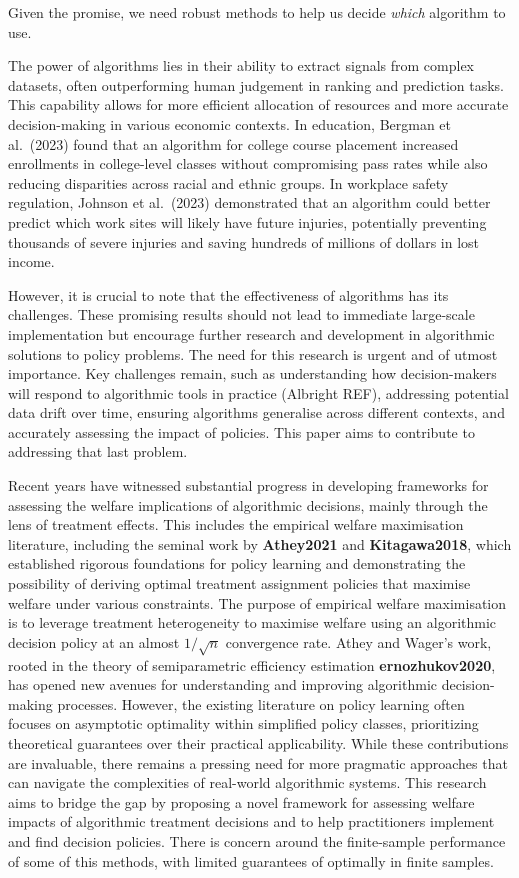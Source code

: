 \documentclass[
]{article}
\begin{document}
Given the promise, we need robust methods to help us decide \emph{which}
algorithm to use.

The power of algorithms lies in their ability to extract signals from
complex datasets, often outperforming human judgement in ranking and
prediction tasks. This capability allows for more efficient allocation
of resources and more accurate decision-making in various economic
contexts. In education, Bergman et al.~(2023) found that an algorithm
for college course placement increased enrollments in college-level
classes without compromising pass rates while also reducing disparities
across racial and ethnic groups. In workplace safety regulation, Johnson
et al.~(2023) demonstrated that an algorithm could better predict which
work sites will likely have future injuries, potentially preventing
thousands of severe injuries and saving hundreds of millions of dollars
in lost income.

However, it is crucial to note that the effectiveness of algorithms has
its challenges. These promising results should not lead to immediate
large-scale implementation but encourage further research and
development in algorithmic solutions to policy problems. The need for
this research is urgent and of utmost importance. Key challenges remain,
such as understanding how decision-makers will respond to algorithmic
tools in practice (Albright REF), addressing potential data drift over
time, ensuring algorithms generalise across different contexts, and
accurately assessing the impact of policies. This paper aims to
contribute to addressing that last problem.

Recent years have witnessed substantial progress in developing
frameworks for assessing the welfare implications of algorithmic
decisions, mainly through the lens of treatment effects. This includes
the empirical welfare maximisation literature, including the seminal
work by \textbf{Athey2021} and \textbf{Kitagawa2018}, which established
rigorous foundations for policy learning and demonstrating the
possibility of deriving optimal treatment assignment policies that
maximise welfare under various constraints. The purpose of empirical
welfare maximisation is to leverage treatment heterogeneity to maximise
welfare using an algorithmic decision policy at an almost \(1/\sqrt{n}\)
convergence rate. Athey and Wager's work, rooted in the theory of
semiparametric efficiency estimation \textbf{ernozhukov2020}, has opened
new avenues for understanding and improving algorithmic decision-making
processes. However, the existing literature on policy learning often
focuses on asymptotic optimality within simplified policy classes,
prioritizing theoretical guarantees over their practical applicability.
While these contributions are invaluable, there remains a pressing need
for more pragmatic approaches that can navigate the complexities of
real-world algorithmic systems. This research aims to bridge the gap by
proposing a novel framework for assessing welfare impacts of algorithmic
treatment decisions and to help practitioners implement and find
decision policies. There is concern around the finite-sample performance
of some of this methods, with limited guarantees of optimally in finite
samples.
\end{document}
